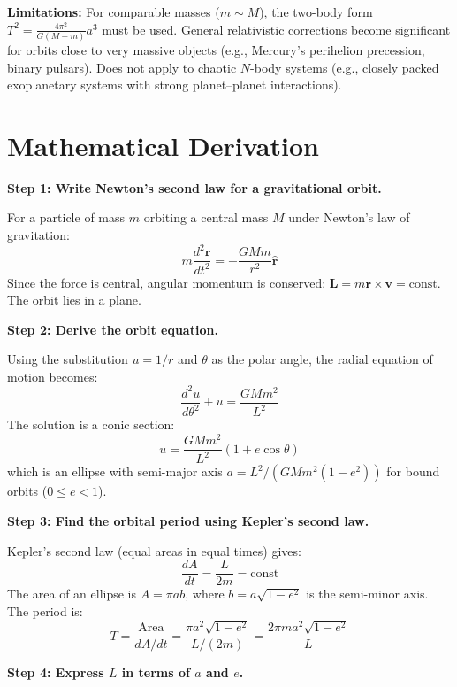 \textbf{Limitations:} For comparable masses ($m \sim M$), the two-body form $T^2 = \frac{4\pi^2}{G(M+m)}a^3$ must be used. General relativistic corrections become significant for orbits close to very massive objects (e.g., Mercury's perihelion precession, binary pulsars). Does not apply to chaotic $N$-body systems (e.g., closely packed exoplanetary systems with strong planet--planet interactions).


\section*{Mathematical Derivation}

\textbf{Step 1: Write Newton's second law for a gravitational orbit.}

For a particle of mass $m$ orbiting a central mass $M$ under Newton's law of gravitation:
\begin{equation}
m\frac{d^2\mathbf{r}}{dt^2} = -\frac{GMm}{r^2}\hat{\mathbf{r}}
\end{equation}
Since the force is central, angular momentum is conserved: $\mathbf{L} = m\mathbf{r}\times\mathbf{v} = \text{const}$. The orbit lies in a plane.

\textbf{Step 2: Derive the orbit equation.}

Using the substitution $u = 1/r$ and $\theta$ as the polar angle, the radial equation of motion becomes:
\begin{equation}
\frac{d^2u}{d\theta^2} + u = \frac{GMm^2}{L^2}
\end{equation}
The solution is a conic section:
\begin{equation}
u = \frac{GMm^2}{L^2}(1 + e\cos\theta)
\end{equation}
which is an ellipse with semi-major axis $a = L^2/(GMm^2(1-e^2))$ for bound orbits ($0 \leq e < 1$).

\textbf{Step 3: Find the orbital period using Kepler's second law.}

Kepler's second law (equal areas in equal times) gives:
\begin{equation}
\frac{dA}{dt} = \frac{L}{2m} = \text{const}
\end{equation}
The area of an ellipse is $A = \pi ab$, where $b = a\sqrt{1-e^2}$ is the semi-minor axis. The period is:
\begin{equation}
T = \frac{\text{Area}}{dA/dt} = \frac{\pi a^2\sqrt{1-e^2}}{L/(2m)} = \frac{2\pi m a^2\sqrt{1-e^2}}{L}
\end{equation}

\textbf{Step 4: Express $L$ in terms of $a$ and $e$.}

